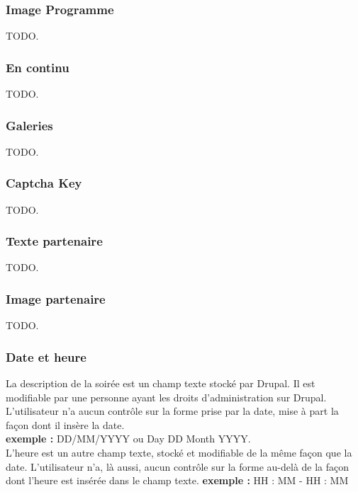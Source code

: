 \documentclass[11pt]{report}
\begin{document}
\subsubsection{Image Programme}

TODO.

\subsubsection{En continu}

TODO.

\subsubsection{Galeries}

TODO.

\subsubsection{Captcha Key}

TODO.

\subsubsection{Texte partenaire}

TODO.

\subsubsection{Image partenaire}

TODO.

\subsubsection{Date et heure}

La description de la soirée est un champ texte stocké par Drupal. Il est
modifiable par une personne ayant les droits d'administration sur Drupal.
L'utilisateur n'a aucun contrôle sur la forme prise par la date, mise à part la
façon dont il insère la date. \\
\textbf{exemple :} DD/MM/YYYY ou Day DD Month YYYY. \\

L'heure est un autre champ texte, stocké et modifiable de la même façon que la
date.
L'utilisateur n'a, là aussi, aucun contrôle sur la forme au-delà de la façon
dont l'heure est insérée dans le champ texte.
\textbf{exemple :} HH : MM - HH : MM \\
\end{document}
